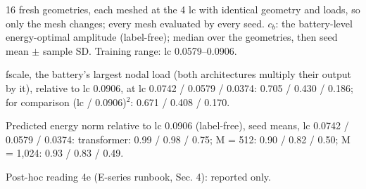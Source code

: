\begin{table}[t]
\centering
\small
\caption{Post-hoc (3D): the label-free amplitude $c_b$ on fixed geometries and loads meshed at four mesh sizes lc.}
\label{tab:remesh}

\smallskip
\begin{minipage}{\linewidth}\footnotesize\raggedright
16 fresh geometries, each meshed at the 4 lc with identical geometry and loads, so only the mesh changes; every mesh evaluated by every seed. $c_b$: the battery-level energy-optimal amplitude (label-free); median over the geometries, then seed mean $\pm$ sample SD. Training range: lc 0.0579--0.0906.\par
fscale, the battery's largest nodal load (both architectures multiply their output by it), relative to lc 0.0906, at lc 0.0742 / 0.0579 / 0.0374: 0.705 / 0.430 / 0.186; for comparison (lc / 0.0906)$^2$: 0.671 / 0.408 / 0.170.\par
Predicted energy norm relative to lc 0.0906 (label-free), seed means, lc 0.0742 / 0.0579 / 0.0374: transformer: 0.99 / 0.98 / 0.75; M = 512: 0.90 / 0.82 / 0.50; M = 1,024: 0.93 / 0.83 / 0.49.\par
Post-hoc reading 4e (E-series runbook, Sec. 4): reported only.
\end{minipage}
\end{table}
